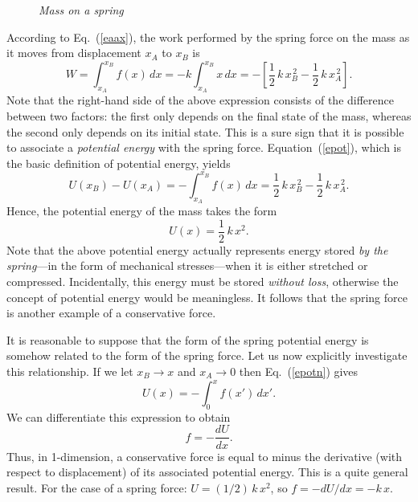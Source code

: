 \begin{figure}
\epsfysize=2.5in
\centerline{}
\caption{\em Mass on a spring}\label{f42}   
\end{figure}

According to Eq.~(\ref{eaax}), the work performed by the spring force on the mass
as it moves from displacement $x_A$ to $x_B$ is
\begin{equation}
W = \int_{x_A}^{x_B} f(x)\,dx = -k\int_{x_A}^{x_B} x\,dx = -\left[
\frac{1}{2}\,k\,x_B^{\,2} -\frac{1}{2}\,k\,x_A^{\,2} \right].
\end{equation}
Note that the right-hand side of the above expression consists of the difference
between two factors: the first only depends on the final state of the mass, whereas the
second only depends on its initial state. This is a sure sign  that it is
possible to associate a {\em potential energy} with the spring force. 
Equation~(\ref{epot}), which is the basic definition of potential
energy, yields
\begin{equation}\label{epotn}
U(x_B) - U(x_A) = -  \int_{x_A}^{x_B} f(x)\,dx = 
\frac{1}{2}\,k\,x_B^{\,2} -\frac{1}{2}\,k\,x_A^{\,2}.
\end{equation}
Hence, the potential energy of the mass takes the form
\begin{equation}
U(x) = \frac{1}{2}\,k\,x^{2}.
\end{equation}
Note that the above potential energy actually represents  energy stored {\em by the
spring}---in
 the form of mechanical stresses---when it is either
stretched or compressed. Incidentally, this energy must be stored {\em without loss}, otherwise
the concept of potential energy would be meaningless. It follows that the spring
force is another  example of a conservative force.

It is reasonable to suppose that the form of the spring potential energy is somehow related to the
form of the spring force. Let us now explicitly investigate this
relationship. If we let $x_B\rightarrow x$ and $x_A\rightarrow 0$ then Eq.~(\ref{epotn})
gives
\begin{equation}
U(x) = -  \int_0^x f(x')\,dx'.
\end{equation}
We can differentiate this expression to obtain
\begin{equation}\label{egrad}
f = -\frac{dU}{dx}.
\end{equation}
Thus, in 1-dimension, a conservative force is equal to minus the derivative (with respect
to displacement) of its associated potential energy. This is a quite general result.
For the case of a
spring force: $U=(1/2)\,k\,x^2$, so $f = - dU/dx = - k\,x$. 

